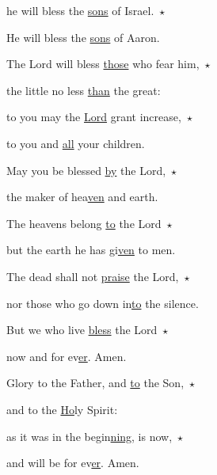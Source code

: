 he will bless the \uline{sons} of Israel.~$\star$~\nopagebreak

He will bless the \uline{sons} of Aaron.



\noindent The Lord will bless \uline{those} who fear him,~$\star$~\nopagebreak

the little no less \uline{than} the great:

\noindent to you may the \uline{Lord} grant increase,~$\star$~\nopagebreak

to you and \uline{all} your children.



\noindent May you be blessed \uline{by} the Lord,~$\star$~\nopagebreak

the maker of hea\uline{ven} and earth.

\noindent The heavens belong \uline{to} the Lord~$\star$~\nopagebreak

but the earth he has gi\uline{ven} to men.



\noindent The dead shall not \uline{praise} the Lord,~$\star$~\nopagebreak

nor those who go down in\uline{to} the silence.

\noindent But we who live \uline{bless} the Lord~$\star$~\nopagebreak

now and for ev\uline{er}. Amen.



\noindent Glory to the Father, and \uline{to} the Son,~$\star$~\nopagebreak

and to the \uline{Ho}ly Spirit:

\noindent as it was in the begin\uline{ning}, is now,~$\star$~\nopagebreak

and will be for ev\uline{er}. Amen.
